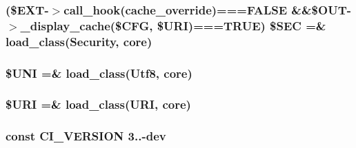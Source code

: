 \subsubsection[{\$\+S\+E\+C}]{ (\$E\+X\+T-\/$>$call\+\_\+hook(\textquotesingle{}cache\+\_\+override\textquotesingle{})===F\+A\+L\+S\+E \&\&\$O\+U\+T-\/$>$\+\_\+display\+\_\+cache(\$C\+F\+G, \$U\+R\+I)===T\+R\+U\+E) \$S\+E\+C =\& load\+\_\+class(\textquotesingle{}Security\textquotesingle{}, \textquotesingle{}core\textquotesingle{})}\label{_code_igniter_8php_af78ce53fb82103e1165678dd2d3385a4}
\hypertarget{_code_igniter_8php_a2060dabd8d00b5b0539bd041bf450924}{}
\subsubsection[{\$\+U\+N\+I}]{\setlength{\rightskip}{0pt plus 5cm}\$U\+N\+I =\& load\+\_\+class(\textquotesingle{}Utf8\textquotesingle{}, \textquotesingle{}core\textquotesingle{})}\label{_code_igniter_8php_a2060dabd8d00b5b0539bd041bf450924}
\hypertarget{_code_igniter_8php_a630d83d898b39ad4568906284f7f5336}{}
\subsubsection[{\$\+U\+R\+I}]{\setlength{\rightskip}{0pt plus 5cm}\$U\+R\+I =\& load\+\_\+class(\textquotesingle{}U\+R\+I\textquotesingle{}, \textquotesingle{}core\textquotesingle{})}\label{_code_igniter_8php_a630d83d898b39ad4568906284f7f5336}
\hypertarget{_code_igniter_8php_a32e3c3927ba8ec93df92327dfd85d564}{}
\subsubsection[{C\+I\+\_\+\+V\+E\+R\+S\+I\+O\+N}]{\setlength{\rightskip}{0pt plus 5cm}const C\+I\+\_\+\+V\+E\+R\+S\+I\+O\+N \textquotesingle{}3..-\/dev\textquotesingle{}}\label{_code_igniter_8php_a32e3c3927ba8ec93df92327dfd85d564}
\hypertarget{_code_igniter_8php_ac5109000d551293e102a2bc06f29cda4}{}
